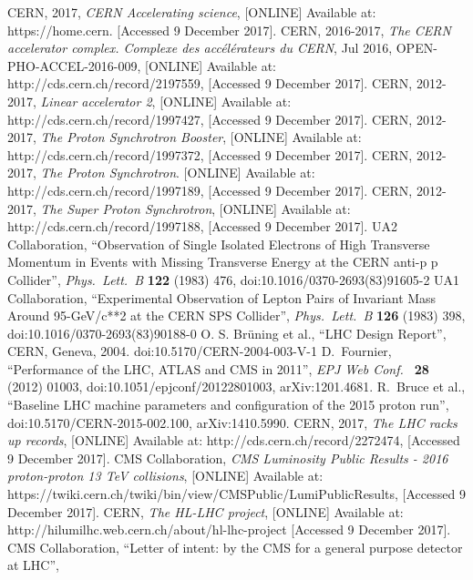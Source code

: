 \begin{thebibliography}{9}
CERN, 2017, {\it CERN Accelerating science}, [ONLINE] Available at: https://home.cern. [Accessed 9 December 2017].
CERN, 2016-2017, {\it The CERN accelerator complex. Complexe des acc{\'e}l{\'e}rateurs du CERN}, Jul 2016, OPEN-PHO-ACCEL-2016-009, [ONLINE] Available at: http://cds.cern.ch/record/2197559, [Accessed 9 December 2017].
CERN, 2012-2017, {\it Linear accelerator 2}, [ONLINE] Available at: http://cds.cern.ch/record/1997427, [Accessed 9 December 2017].
CERN, 2012-2017, {\it The Proton Synchrotron Booster}, [ONLINE] Available at: http://cds.cern.ch/record/1997372, [Accessed 9 December 2017].
CERN, 2012-2017, {\it The Proton Synchrotron}. [ONLINE] Available at: http://cds.cern.ch/record/1997189, [Accessed 9 December 2017].
CERN, 2012-2017, {\it The Super Proton Synchrotron}, [ONLINE] Available at: http://cds.cern.ch/record/1997188, [Accessed 9 December 2017].
UA2 Collaboration, ``Observation of Single Isolated Electrons of High Transverse Momentum in Events with Missing Transverse Energy at the CERN anti-p p Collider'', {\it Phys.\ Lett.\ B} {\bf 122} (1983) 476, doi:10.1016/0370-2693(83)91605-2
UA1 Collaboration, ``Experimental Observation of Lepton Pairs of Invariant Mass Around 95-GeV/c**2 at the CERN SPS Collider'', {\it Phys.\ Lett.\ B} {\bf 126} (1983) 398, doi:10.1016/0370-2693(83)90188-0
O. S. Brüning et al., “LHC Design Report”, CERN, Geneva, 2004. doi:10.5170/CERN-2004-003-V-1
D.~Fournier, ``Performance of the LHC, ATLAS and CMS in 2011'', {\it EPJ Web Conf.\ } {\bf 28} (2012) 01003, doi:10.1051/epjconf/20122801003, arXiv:1201.4681.
 R.~Bruce et al., ``Baseline LHC machine parameters and configuration of the 2015 proton run'', doi:10.5170/CERN-2015-002.100, arXiv:1410.5990.
CERN, 2017, {\it The LHC racks up records}, [ONLINE] Available at: http://cds.cern.ch/record/2272474, [Accessed 9 December 2017].
CMS Collaboration, {\it CMS Luminosity Public Results - 2016 proton-proton 13 TeV collisions},
[ONLINE] Available at: https://twiki.cern.ch/twiki/bin/view/CMSPublic/LumiPublicResults, [Accessed 9 December 2017].
CERN, {\it The HL-LHC project},
[ONLINE] Available at: http://hilumilhc.web.cern.ch/about/hl-lhc-project [Accessed 9 December 2017].
CMS Collaboration, “Letter of intent: by the CMS for a general purpose detector at LHC”,

\end{thebibliography}
